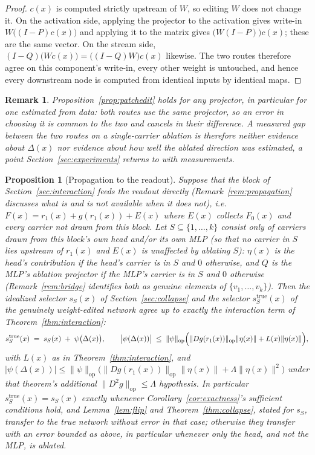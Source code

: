 \documentclass[11pt,a4paper]{article}
\newtheorem{proposition}{Proposition}
\newtheorem{remark}{Remark}
\begin{document}
\begin{proof}
$c(x)$ is computed strictly upstream of $W$, so editing $W$ does not change
it. On the activation side, applying the projector to the activation gives
write-in $W\bigl((I-P)c(x)\bigr)$ and applying it to the matrix gives
$\bigl(W(I-P)\bigr)c(x)$; these are the same vector. On the stream side,
$(I-Q)\bigl(Wc(x)\bigr)=\bigl((I-Q)W\bigr)c(x)$ likewise. The two routes
therefore agree on this component's write-in, every other weight is untouched,
and hence every downstream node is computed from identical inputs by identical
maps.
\end{proof}

\begin{remark}
\label{rem:patchedit-estimation}
Proposition~\ref{prop:patchedit} holds for \emph{any} projector, in particular
for one estimated from data: both routes use the same projector, so an error
in choosing it is common to the two and cancels in their difference. A
measured gap between the two routes on a single-carrier ablation is therefore
neither evidence about $\Delta(x)$ nor evidence about how well the ablated
direction was estimated, a point Section~\ref{sec:experiments} returns to
with measurements.
\end{remark}

\begin{proposition}[Propagation to the readout]
\label{prop:readout}
Suppose that the block of
Section~\ref{sec:interaction} feeds the readout directly
(Remark~\ref{rem:propagation} discusses what is and is not available when it
does not), i.e.\
$F(x)=r_1(x)+g(r_1(x))+E(x)$ where $E(x)$ collects $F_0(x)$ and every carrier
not drawn from this block. Let $S\subseteq\{1,\dots,k\}$ consist only of
carriers drawn from this block's own head and/or its own MLP (so that no
carrier in $S$ lies upstream of $r_1(x)$ and $E(x)$ is unaffected by
ablating $S$): $\eta(x)$ is the head's contribution if the head's carrier is
in $S$ and $0$ otherwise, and $Q$ is the MLP's ablation projector if the
MLP's carrier is in $S$ and $0$ otherwise (Remark~\ref{rem:bridge} identifies
both as genuine elements of $\{v_1,\dots,v_k\}$). Then the idealized
selector $s_S(x)$ of Section~\ref{sec:collapse} and the selector
$s_S^{\mathrm{true}}(x)$ of the genuinely weight-edited network agree up to
exactly the interaction term of Theorem~\ref{thm:interaction}:
\[
s_S^{\mathrm{true}}(x) \;=\; s_S(x) \;+\; \psi\bigl(\Delta(x)\bigr), \qquad
\bigl|\psi(\Delta(x))\bigr| \;\le\; \|\psi\|_{\mathrm{op}}\Bigl(\|Dg(r_1(x))\|_{\mathrm{op}}\|\eta(x)\|+L(x)\|\eta(x)\|\Bigr),
\]
with $L(x)$ as in Theorem~\ref{thm:interaction}, and
$\bigl|\psi(\Delta(x))\bigr|\le\|\psi\|_{\mathrm{op}}\bigl(\|Dg(r_1(x))\|_{\mathrm{op}}\|\eta(x)\|+\Lambda\|\eta(x)\|^2\bigr)$
under that theorem's additional $\|D^2g\|_{\mathrm{op}}\le\Lambda$ hypothesis.
In particular $s_S^{\mathrm{true}}(x)=s_S(x)$ exactly whenever
Corollary~\ref{cor:exactness}'s sufficient conditions hold, and
Lemma~\ref{lem:flip} and Theorem~\ref{thm:collapse}, stated for $s_S$,
transfer to the true network without error in that case; otherwise they
transfer with an error bounded as above, in particular whenever only the
head, and not the MLP, is ablated.
\end{proposition}
\end{document}
